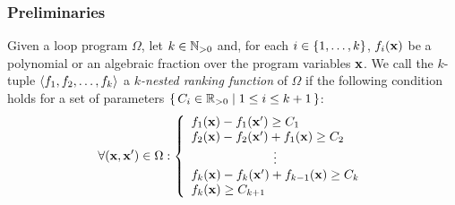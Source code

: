 
\begin{frame}
\frametitle{Preliminaries}
\begin{myDefinition}
\label{def:nestedRankingFunction}
	Given a loop program $\Omega$, let $k \in \mathbb{N}_{> 0}$ and, for each $i \in \{1, \dotsc, k\}$, $f_{i}(\mathbf{x})$ be a polynomial or an algebraic fraction over the program variables $\mathbf{x}$. 
	We call the $k$-tuple $\langle f_{1}, f_{2}, \dotsc, f_{k}\rangle$ a \emph{$k$-nested ranking function} of $\Omega$ if the following condition holds for a set of parameters $\{\, C_{i} \in \mathbb{R}_{> 0} \mid 1 \leq i \leq k+1 \,\}$:
	\begin{equation}
		\forall (\varsvec,\varsvec') \in \Omega :
		\left\{
			\begin{array}{ll}
				\affrank_{1}(\varsvec) - \affrank_{1}(\varsvec') \geq C_{1} \\
				\affrank_{2}(\varsvec) - \affrank_{2}(\varsvec') + \affrank_{1}(\varsvec) \geq C_{2} \\
				\multicolumn{1}{c}{\vdots} \\
				\affrank_{k}(\varsvec) - \affrank_{k}(\varsvec') + \affrank_{k-1}(\varsvec) \geq C_{k} \\
				\affrank_{k}(\varsvec) \geq C_{k+1}
			\end{array}
		\right. \notag
		\label{eq:nestedProgress}
	\end{equation}
\end{myDefinition}
\end{frame}

